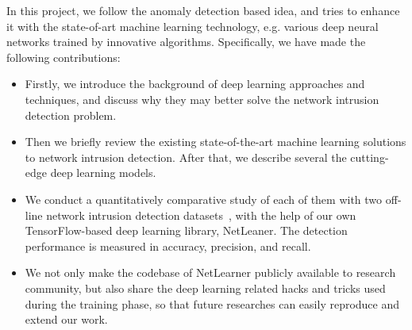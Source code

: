 In this project, we follow the anomaly detection based idea, and tries to enhance it with the
state-of-art machine learning technology, e.g. various deep neural networks trained by innovative algorithms.
Specifically, we have made the following contributions:
\begin{itemize}
    \item Firstly, we introduce the background of deep learning approaches and techniques,
        and discuss why they may better solve the network intrusion detection problem.
    \item Then we briefly review the existing state-of-the-art machine learning solutions to network intrusion detection.
        After that, we describe several the cutting-edge deep learning models.
    \item We conduct a quantitatively comparative study of each of them with
        two off-line network intrusion detection datasets~\cite{NSL-KDD, UNSW},
        with the help of our own TensorFlow-based deep learning library, NetLeaner.
        The detection performance is measured in accuracy, precision, and recall.
    \item We not only make the codebase of NetLearner publicly available to research community,
        but also share the deep learning related hacks and tricks used during the training phase,
        so that future researches can easily reproduce and extend our work.
\end{itemize}

